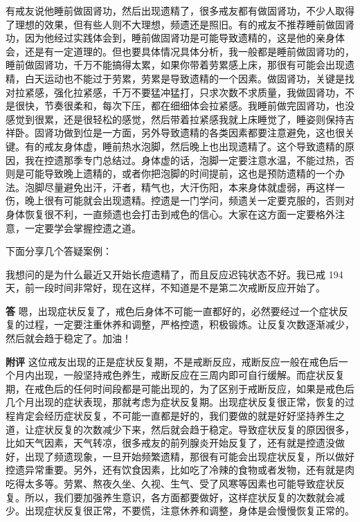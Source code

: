 有戒友说他睡前做固肾功，然后出现遗精了，很多戒友都有做固肾功，不少人取得了理想的效果，但有些人则不大理想，频遗还是照旧。有的戒友不推荐睡前做固肾功，因为他经过实践体会到，睡前做固肾功是可能导致遗精的，这是他的亲身体会，还是有一定道理的。但也要具体情况具体分析，我一般都是睡前做固肾功的，睡前做固肾功，千万不能搞得太累，如果你带着劳累感上床，那很有可能会出现遗精，白天运动也不能过于劳累，劳累是导致遗精的一个因素。做固肾功，关键是找对拉紧感，强化拉紧感，千万不要猛冲猛打，只求次数不求质量，我做固肾功，不是很快，节奏很柔和，每次下压，都在细细体会拉紧感。我睡前做完固肾功，也没感觉到很累，还是很轻松的感觉，然后带着拉紧感我就上床睡觉了，睡姿则保持吉祥卧。固肾功做到位是一方面，另外导致遗精的各类因素都要注意避免，这也很关键。有的戒友身体虚，睡前热水泡脚，然后晚上也出现遗精了。这个导致遗精的原因，我在控遗那季专门总结过。身体虚的话，泡脚一定要注意水温，不能过热，否则是可能导致晚上遗精的，或者你把泡脚的时间提前，这也是预防遗精的一个办法。泡脚尽量避免出汗，汗者，精气也，大汗伤阳，本来身体就虚弱，再这样一伤，晚上很有可能就会出现遗精。控遗是一门学问，频遗关一定要克服的，否则对身体恢复很不利，一直频遗也会打击到戒色的信心。大家在这方面一定要格外注意，一定要学会掌握控遗之道。

下面分享几个答疑案例：

\begin{case}
    我想问的是为什么最近又开始长痘遗精了，而且反应迟钝状态不好。我已戒 194 天，前一段时间非常好，现在这样，不知道是不是第二次戒断反应开始了。

    \textbf{答} 嗯，出现症状反复了，戒色后身体不可能一直都好的，必然要经过一个症状反复的过程，一定要注重休养和调整，严格控遗，积极锻炼。让反复次数逐渐减少，然后就会趋于稳定了。加油！

    \textbf{附评} 这位戒友出现的正是症状反复期，不是戒断反应，戒断反应一般在戒色后一个月内出现，一般坚持戒色养生，戒断反应在三周内即可自行缓解。而症状反复期，在戒色后的任何时间段都是可能出现的，为了区别于戒断反应，如果是戒色后几个月出现的症状表现，那就考虑为症状反复期。出现症状反复很正常，恢复的过程肯定会经历症状反复，不可能一直都是好的，我们要做的就是好好坚持养生之道，让症状反复的次数减少下来，然后就会趋于稳定。导致症状反复的原因很多，比如天气因素，天气转凉，很多戒友的前列腺炎开始反复了，还有就是控遗没做好，出现了频遗现象，一旦开始频繁遗精，那很有可能会出现症状反复，所以做好控遗异常重要。另外，还有饮食因素，比如吃了冷辣的食物或者发物，还有就是肉吃得太多等。劳累、熬夜久坐、久视、生气、受了风寒等因素也可能导致症状反复。所以，我们要加强养生意识，各方面都要做好，这样症状反复的次数就会减少。出现症状反复很正常，不要慌，注意休养和调整，身体是会慢慢恢复正常的。
\end{case}

